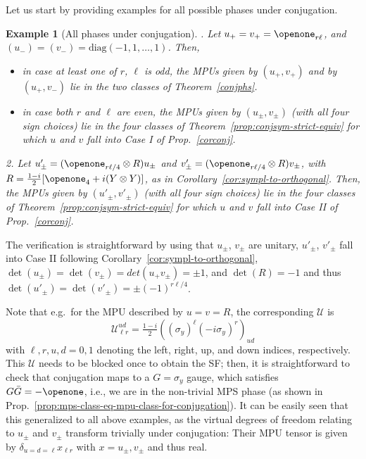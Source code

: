 \documentclass[pra,twocolumn,nofootinbib,superscriptaddress]{revtex4-1}
\def\Id{{\openone}}
\newtheorem{example}[thm]{Example}
\begin{document}
Let us start by providing examples for all possible phases under
conjugation.

\begin{example}[All phases under conjugation]
	\quad{}. Let $u_+=v_+=\openone_{r\ell}$, and
	$(u_-)=(v_-)=\mathrm{diag}(-1,1,\dots,1)$. Then,
	\begin{itemize}
		\item in case at least one of $r$, $\ell$ is odd,
		      the MPUs given by $(u_+,v_+)$ and by $(u_+,v_-)$ lie in the two
		      classes of Theorem~\ref{conjphs}.
		\item in case both $r$ and $\ell$ are even, the MPUs given by
		      $(u_\pm,v_\pm)$ (with all four sign choices) lie in the four classes
		      of Theorem~\ref{prop:conjsym-strict-equiv} for which $u$ and $v$ fall
		      into Case I of Prop.~\ref{corconj}.
	\end{itemize}
	2. Let $u'_\pm=(\openone_{r\ell/4}\otimes R)u_{\pm}$ and
	$v'_\pm=(\openone_{r\ell/4}\otimes R)v_{\pm}$, with $R=\frac{1-i}{2}
		[\Id_4 + i(Y\otimes Y)]$, as in
	Corollary~\ref{cor:sympl-to-orthogonal}. Then, the MPUs given by
	$(u'_\pm,v'_\pm)$ (with all four sign choices) lie in the four classes of
	Theorem~\ref{prop:conjsym-strict-equiv} for which $u$ and $v$ fall into
	Case II of Prop.~\ref{corconj}.
\end{example}
\noindent
The verification is straightforward by using that $u_\pm$, $v_\pm$ are
unitary, $u'_\pm$, $v'_\pm$ fall into Case II following
Corollary~\ref{cor:sympl-to-orthogonal},
$\det(u_\pm)=\det(v_\pm)=det(u_+v_\pm)=\pm1$, and $\det(R)=-1$ and thus
$\det(u'_{\pm})=\det(v'_{\pm})=\pm (-1)^{r\ell/4}$.


Note that e.g.\ for the MPU described by $u=v=R$, the corresponding
$\mathcal U$ is
\[
	\mathcal U_{\ell r}^{ud}=
	\tfrac{1-i}{2}((\sigma_y)^{\ell}(-i\sigma_y)^{r})_{ud}
\]
with $\ell,r,u,d=0,1$ denoting the left, right, up, and down indices,
respectively.  This $\mathcal U$ needs to be blocked once to obtain the
SF; then, it is straightforward to check that conjugation maps to
a $G=\sigma_y$ gauge, which satisfies $G\bar{G}=-\openone$,
i.e., we are in the non-trivial MPS phase (as shown in
Prop.~\ref{prop:mps-class-eq-mpu-class-for-conjugation}).  It can be
easily seen that this generalized to all above examples, as the virtual
degrees of freedom relating to $u_\pm$ and $v_\pm$ transform trivially
under conjugation: Their MPU tensor is given by $\delta_{u=d=\ell}x_{\ell
			r}$ with $x=u_\pm,v_\pm$ and thus real.
\end{document}
